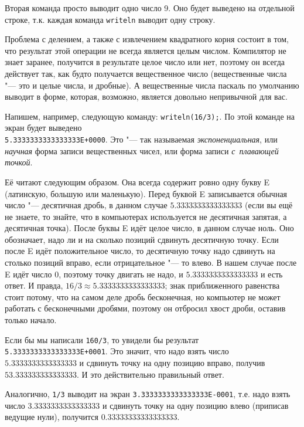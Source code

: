 Вторая команда просто выводит одно число 9. Оно будет выведено на отдельной строке, т.к. каждая команда \verb`writeln` выводит одну строку.


Проблема с делением, а также с извлечением квадратного корня состоит в том, что результат этой 
операции не всегда является целым числом. Компилятор не знает заранее, получится в результате целое 
число или нет, поэтому он всегда действует так, как будто получается вещественное число 
(вещественные числа "--- это и целые числа, и дробные). А вещественные числа паскаль по умолчанию 
выводит в форме, которая, возможно, является довольно непривычной для вас.

Напишем, например, следующую команду: \verb`writeln(16/3);`. По этой команде на экран будет выведено\\
\verb`5.3333333333333333E+0000`. Это "--- так называемая \textit{экспоненциальная}, или \textit{научная} форма записи вещественных чисел, или форма записи \textit{с~плавающей точкой}. 

Её читают следующим образом. Она всегда содержит ровно одну букву E (латинскую, большую или маленькую). Перед буквой E записывается обычная число "--- десятичная дробь, в данном случае $5.3333333333333333$ (если вы ещё не знаете, то знайте, что в компьютерах используется не десятичная запятая, а десятичная точка). После буквы E идёт целое число, в данном случае ноль. Оно обозначает, надо ли и на сколько позиций сдвинуть десятичную точку. Если после E идёт положительное число, то десятичную точку надо сдвинуть на столько позиций вправо, если отрицательное "--- то влево. В нашем случае после E идёт число 0, поэтому точку двигать не надо, и $5.3333333333333333$ и есть ответ. И правда, $16/3\approx 5.3333333333333333$; знак приближенного равенства стоит потому, что на самом деле дробь бесконечная, но компьютер не может работать с бесконечными дробями, поэтому он отбросил хвост дроби, оставив только начало.

Если бы мы написали \verb`160/3`, то увидели бы результат \verb`5.3333333333333333E+0001`. Это значит, что надо взять число $5.3333333333333333$ и сдвинуть точку на одну позицию вправо, получив $53.333333333333333$. И это действительно правильный ответ. 

Аналогично, \verb`1/3` выводит на экран \verb`3.3333333333333333E-0001`, т.е. надо взять число $3.3333333333333333$ и сдвинуть точку на одну позицию влево (приписав ведущие нули), получится $0.33333333333333333$.

